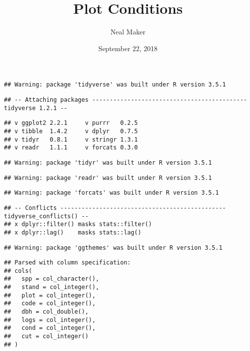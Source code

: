 \documentclass[]{article}
\title{Plot Conditions}
\author{Neal Maker}
\date{September 22, 2018}
\begin{document}
\maketitle

\begin{verbatim}
## Warning: package 'tidyverse' was built under R version 3.5.1
\end{verbatim}

\begin{verbatim}
## -- Attaching packages -------------------------------------------- tidyverse 1.2.1 --
\end{verbatim}

\begin{verbatim}
## v ggplot2 2.2.1     v purrr   0.2.5
## v tibble  1.4.2     v dplyr   0.7.5
## v tidyr   0.8.1     v stringr 1.3.1
## v readr   1.1.1     v forcats 0.3.0
\end{verbatim}

\begin{verbatim}
## Warning: package 'tidyr' was built under R version 3.5.1
\end{verbatim}

\begin{verbatim}
## Warning: package 'readr' was built under R version 3.5.1
\end{verbatim}

\begin{verbatim}
## Warning: package 'forcats' was built under R version 3.5.1
\end{verbatim}

\begin{verbatim}
## -- Conflicts ----------------------------------------------- tidyverse_conflicts() --
## x dplyr::filter() masks stats::filter()
## x dplyr::lag()    masks stats::lag()
\end{verbatim}

\begin{verbatim}
## Warning: package 'ggthemes' was built under R version 3.5.1
\end{verbatim}

\begin{verbatim}
## Parsed with column specification:
## cols(
##   spp = col_character(),
##   stand = col_integer(),
##   plot = col_integer(),
##   code = col_integer(),
##   dbh = col_double(),
##   logs = col_integer(),
##   cond = col_integer(),
##   cut = col_integer()
## )
\end{verbatim}
\end{document}
